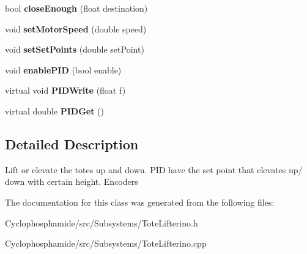 \begin{DoxyCompactItemize}
\item 
\hypertarget{class_tote_lifterino_a6d449a8d4da13035d3f8e0088800f17e}{}bool {\bfseries close\+Enough} (float destination)\label{class_tote_lifterino_a6d449a8d4da13035d3f8e0088800f17e}

\item 
\hypertarget{class_tote_lifterino_a116242e1863680c49bc06d4b1156fa3a}{}void {\bfseries set\+Motor\+Speed} (double speed)\label{class_tote_lifterino_a116242e1863680c49bc06d4b1156fa3a}

\item 
\hypertarget{class_tote_lifterino_a250fddcbc35ffcb892d2f5575f6ebf4c}{}void {\bfseries set\+Set\+Points} (double set\+Point)\label{class_tote_lifterino_a250fddcbc35ffcb892d2f5575f6ebf4c}

\item 
\hypertarget{class_tote_lifterino_a8c56fb38fc532d99435c45eb500f78a7}{}void {\bfseries enable\+P\+I\+D} (bool enable)\label{class_tote_lifterino_a8c56fb38fc532d99435c45eb500f78a7}

\item 
\hypertarget{class_tote_lifterino_a4052d75b1f14d29faab681e93e41ac3c}{}virtual void {\bfseries P\+I\+D\+Write} (float f)\label{class_tote_lifterino_a4052d75b1f14d29faab681e93e41ac3c}

\item 
\hypertarget{class_tote_lifterino_a61ffaaf13e324571879ab8f353e8cd9d}{}virtual double {\bfseries P\+I\+D\+Get} ()\label{class_tote_lifterino_a61ffaaf13e324571879ab8f353e8cd9d}

\end{DoxyCompactItemize}


\subsection{Detailed Description}
Lift or elevate the totes up and down. P\+I\+D have the set point that elevates up/ down with certain height. Encoders 

The documentation for this class was generated from the following files\+:\begin{DoxyCompactItemize}
\item 
Cyclophosphamide/src/\+Subsystems/Tote\+Lifterino.\+h\item 
Cyclophosphamide/src/\+Subsystems/Tote\+Lifterino.\+cpp\end{DoxyCompactItemize}
